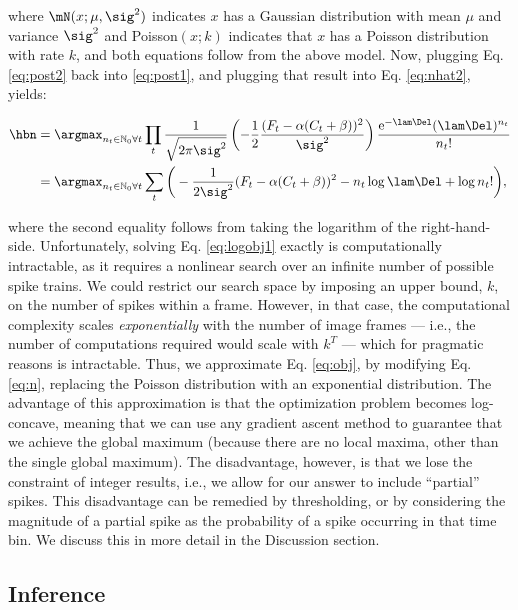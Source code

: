 \noindent where $\mN(x;\mu,\sig^2)$ indicates $x$ has a Gaussian distribution with mean $\mu$ and variance $\sig^2$ and Poisson$(x;k)$ indicates that $x$ has a Poisson distribution with rate $k$, and both equations follow from the above model.  Now, plugging Eq. \eqref{eq:post2} back into \eqref{eq:post1}, and plugging that result into Eq. \eqref{eq:nhat2}, yields:

\begin{subequations}  \label{eq:obj}
\begin{align}
\hbn 	&= \anx \prod_t \frac{1}{\sqrt{2 \pi \sig^2}} \left(-\frac{1}{2}\frac{(F_t - \alpha (C_t + \beta))^2}{\sig^2}\right) \frac{\text{e}^{-\lam\Del} (\lam\Del)^{n_t}}{n_t!}
\label{eq:obj1}\\ &= \anx  \sum_t \bigg( -\frac{1}{2 \sig^2}(F_t - \alpha(C_t + \beta))^2  -  n_t \log \lam \Del + \log n_t! \bigg), \label{eq:logobj1}
\end{align} 
\end{subequations}

\noindent where the second equality follows from taking the logarithm of the right-hand-side.  Unfortunately, solving Eq. \eqref{eq:logobj1} exactly is computationally intractable, as it requires a nonlinear search over an infinite number of  possible spike trains.  We could restrict our search space by imposing an upper bound, $k$, on the number of spikes within a frame.  However, in that case, the computational complexity scales \emph{exponentially} with the number of image frames --- i.e., the number of computations required would scale with $k^T$ --- which for pragmatic reasons is intractable.  Thus, we approximate Eq. \eqref{eq:obj}, by modifying Eq. \eqref{eq:n}, replacing the Poisson distribution with an exponential distribution.  The advantage of this approximation is that the optimization problem becomes log-concave, meaning that we can use any gradient ascent method to guarantee that we achieve the global maximum (because there are no local maxima, other than the single global maximum).  The disadvantage, however, is that we lose the constraint of integer results, i.e., we allow for our answer to include ``partial'' spikes.  This disadvantage can be remedied by thresholding, or by considering the magnitude of a partial spike as the probability of a spike occurring in that time bin.  We discuss this in more detail in the Discussion section.





\subsection{Inference} \label{sec:inf}

